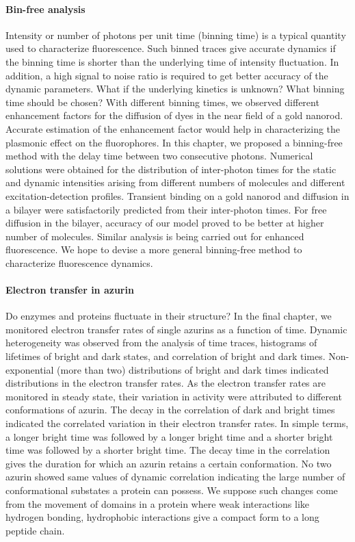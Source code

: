 \paragraph*{Bin-free analysis}
Intensity or number of photons per unit time (binning time) is a typical quantity used to characterize fluorescence. Such binned traces give accurate dynamics if the binning time is shorter than the underlying time of intensity fluctuation. In addition, a high signal to noise ratio is required to get better accuracy of the dynamic parameters. What if the underlying kinetics is unknown? What binning time should be chosen? With different binning times, we observed different enhancement factors for the diffusion of dyes in the near field of a gold nanorod. Accurate estimation of the enhancement factor would help in characterizing the plasmonic effect on the fluorophores. In this chapter, we proposed a binning-free method with the delay time between two consecutive photons. Numerical solutions were obtained for the distribution of inter-photon times for the static and dynamic intensities arising from different numbers of molecules and different excitation-detection profiles. Transient binding on a gold nanorod and diffusion in a bilayer were satisfactorily predicted from their inter-photon times. For free diffusion in the bilayer, accuracy of our model proved to be better at higher number of molecules. Similar analysis is being carried out for enhanced fluorescence. We hope to devise a more general binning-free method to characterize fluorescence dynamics.

\paragraph*{Electron transfer in azurin}
Do enzymes and proteins fluctuate in their structure? In the final chapter, we monitored electron transfer rates of single azurins as a function of time. Dynamic heterogeneity was observed from the analysis of time traces, histograms of lifetimes of bright and dark states, and correlation of bright and dark times. Non-exponential (more than two) distributions of bright and dark times indicated distributions in the electron transfer rates. As the electron transfer rates are monitored in steady state, their variation in activity were attributed to different conformations of azurin. The decay in the correlation of dark and bright times indicated the correlated variation in their electron transfer rates. In simple terms, a longer bright time was followed by a longer bright time and a shorter bright time was followed by a shorter bright time. The decay time in the correlation gives the duration for which an azurin retains a certain conformation. No two azurin showed same values of dynamic correlation indicating the large number of conformational substates a protein can possess. We suppose such changes come from the movement of domains in a protein where weak interactions like hydrogen bonding, hydrophobic interactions give a compact form to a long peptide chain. 

